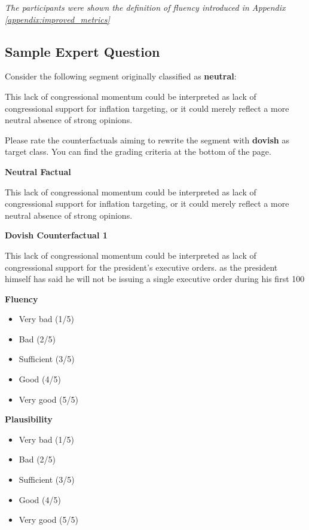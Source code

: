 \documentclass[11pt]{article}
\begin{document}
\textit{The participants were shown the definition of fluency introduced in Appendix \ref{appendix:improved_metrics}}

\subsection{Sample Expert Question}

Consider the following segment originally classified as \textbf{neutral}:

This lack of congressional momentum could be interpreted as lack of congressional support for inflation targeting, or it could merely reflect a more neutral absence of strong opinions.

Please rate the counterfactuals aiming to rewrite the segment with \textbf{dovish} as target class. You can find the grading criteria at the bottom of the page.

\textbf{Neutral Factual}

This lack of congressional momentum could be interpreted as lack of congressional support for inflation targeting, or it could merely reflect a more neutral absence of strong opinions.

\textbf{Dovish Counterfactual 1}

This lack of congressional momentum could be interpreted as lack of congressional support for the president's executive orders. as the president himself has said he will not be issuing a single executive order during his first 100


\textbf{Fluency}

\begin{itemize}
    \item Very bad (1/5)
    \item Bad (2/5)
    \item Sufficient (3/5)
    \item Good (4/5)
    \item Very good (5/5)
\end{itemize}


\textbf{Plausibility}

\begin{itemize}
    \item Very bad (1/5)
    \item Bad (2/5)
    \item Sufficient (3/5)
    \item Good (4/5)
    \item Very good (5/5)
\end{itemize}
\end{document}
